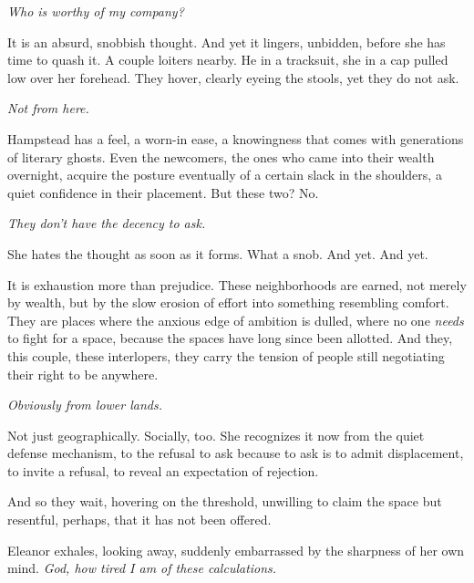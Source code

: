 \textit{Who is worthy of my company?} 

\smallskip

It is an absurd, snobbish thought. And yet it lingers, unbidden, before she has time to quash it. A couple loiters nearby. He in a tracksuit, she in a cap pulled low over her forehead. They hover, clearly eyeing the stools, yet they do not ask.

\smallskip

\textit{Not from here.}

\smallskip

Hampstead has a feel, a worn-in ease, a knowingness that comes with generations of literary ghosts. Even the newcomers, the ones who came into their wealth overnight, acquire the posture eventually of a certain slack in the shoulders, a quiet confidence in their placement.  But these two? No. 

\smallskip

\textit{They don’t have the decency to ask.}

\smallskip

She hates the thought as soon as it forms. What a snob. And yet. And yet. 

\smallskip

It is exhaustion more than prejudice. These neighborhoods are earned, not merely by wealth, but by the slow erosion of effort into something resembling comfort. They are places where the anxious edge of ambition is dulled, where no one \textit{needs} to fight for a space, because the spaces have long since been allotted.  And they, this couple, these interlopers, they carry the tension of people still negotiating their right to be anywhere.

\smallskip

\textit{Obviously from lower lands.}

\smallskip

Not just geographically. Socially, too. She recognizes it now from the quiet defense mechanism, to the refusal to ask because to ask is to admit displacement, to invite a refusal, to reveal an expectation of rejection.

\smallskip

And so they wait, hovering on the threshold, unwilling to claim the space but resentful, perhaps, that it has not been offered.

\smallskip

Eleanor exhales, looking away, suddenly embarrassed by the sharpness of her own mind. \textit{God, how tired I am of these calculations.} 

